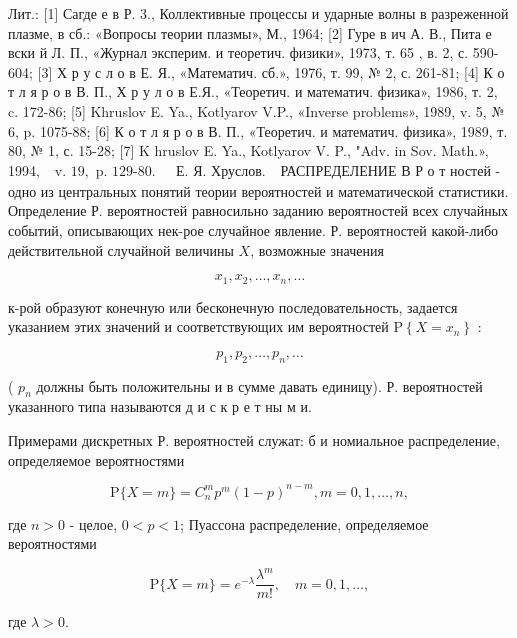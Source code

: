 \documentclass[10pt]{article}
\begin{document}
Лит.: [1] Сагде е в Р. 3., Коллективные процессы и ударные волны в разреженной плазме, в сб.: «Вопросы теории плазмы», М., 1964; [2] Гуре в ич А. В., Пита е вски й Л. П., «Журнал эксперим. и теоретич. физики», 1973, т. 65 , в. 2, с. 590-604; [3] Х р у с л о в Е. Я., «Математич. сб.», 1976, т. 99, № 2, с. 261-81; [4] К о т л я р о в В. П., Х р у л о в Е.Я., «Теоретич. и математич. физика», 1986, т. 2, c. 172-86; [5] Khruslov E. Ya., Kotlyarov V.P., «Inverse problems», 1989, v. 5, № 6, p. 1075-88; [6] К о т л я р о в В. П., «Теоретич. и математич. физика», 1989, т. 80, № 1, с. 15-28; [7] K hruslov E. Ya., Kotlyarov V. P., "Adv. in Sov. Math.», 1994, $\begin{array}{ll}\text { v. } 19, \text { p. 129-80. } & \text { Е. Я. Хруслов. }\end{array}$ РАСПРЕДЕЛЕНИЕ В Р о т ностей - одно из центральных понятий теории вероятностей и математической статистики. Определение Р. вероятностей равносильно заданию вероятностей всех случайных событий, описывающих нек-рое случайное явление. Р. вероятностей какой-либо действительной случайной величины $X$, возможные значения



\[

x_{1}, x_{2}, \ldots, x_{n}, \ldots

\]



к-рой образуют конечную или бесконечную последовательность, задается указанием этих значений и соответствующих им вероятностей $\mathrm{P}\left\{X=x_{n}\right\}$ :



\[

p_{1}, p_{2}, \ldots, p_{n}, \ldots

\]



( $p_{n}$ должны быть положительны и в сумме давать единицу). Р. вероятностей указанного типа называются д и с к р е т ны м и.



Примерами дискретных Р. вероятностей служат: б и номиальное распределение, определяемое вероятностями



\[

\mathrm{P}\{X=m\}=C_{n}^{m} p^{m}(1-p)^{n-m}, m=0,1, \ldots, n,

\]



где $n>0$ - целое, $0<p<1$; Пуассона распределение, определяемое вероятностями



\[

\mathrm{P}\{X=m\}=e^{-\lambda} \frac{\lambda^{m}}{m !}, \quad m=0,1, \ldots,

\]



где $\lambda>0$.
\end{document}

